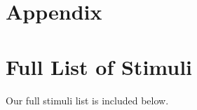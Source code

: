 \documentclass[
  12pt,
]{scrartcl}
\begin{document}
\newpage

\section*{Appendix}\label{appendix}

\appendix

\renewcommand{\thesection}{\Alph{section}}

\setcounter{section}{0}



\section{Full List of Stimuli}\label{sec-full-list-of-stimuli}

Our full stimuli list is included below.
\end{document}
